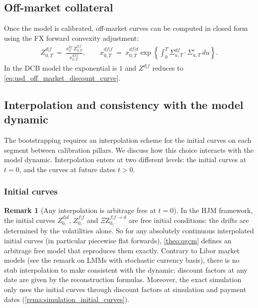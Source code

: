 \documentclass[11pt,english]{amsart}
\newcommand{\QZ}{{\Xi\mathrm{Z}}}
\theoremstyle{definition}
\newtheorem{rema}{Remark}
\begin{document}
\subsection{Off-market collateral}\label{ssec:cal_off_market}%

Once the model is calibrated, off-market curves can be computed in closed form using the FX forward convexity adjustment:
\begin{eqnarray*}
  Z^{d|f}_{0,T} ~=~ \frac{x^{df}_0\,Z^{f|f}_{0,T}}{x^{df|f}_{0,T}} , \qquad
  x^{df|f}_{0,T} ~=~ x^{df|d}_{0,T}\exp\left\{\int_0^T\Sigma^{df}_{u,T}\cdot\Sigma^c_{u,T}\,du\right\} .
\end{eqnarray*}
In the DCB model the exponential is $1$ and $Z^{d|f}$ reduces to \eqref{eq:usd_off_market_discount_curve}.


\newpage%
\subsection{Interpolation and consistency with the model dynamic}\label{ssec:interpolation_consistency}

The bootstrapping requires an interpolation scheme for the initial curves on each segment between calibration pillars. We discuss how this choice interacts with the model dynamic. Interpolation enters at two different levels: the initial curves at $t=0$, and the curves at future dates $t>0$.

\subsubsection{Initial curves}

\begin{rema}[Any interpolation is arbitrage free at $t=0$]
In the HJM framework, the initial curves $Z^{d|d}_{0,\cdot}$, $Z^{f|f}_{0,\cdot}$ and $\QZ^{f|f\to d}_{0,\cdot}$ are free initial conditions: the drifts are determined by the volatilities alone. So for any absolutely continuous interpolated initial curves (in particular piecewise flat forwards), \autoref{theo:qgcm} defines an arbitrage free model that reproduces them exactly. Contrary to Libor market models (see the remark on LMMs with stochastic currency basis), there is no stub interpolation to make consistent with the dynamic: discount factors at any date are given by the reconstruction formulas. Moreover, the exact simulation only uses the initial curves through discount factors at simulation and payment dates (\autoref{rema:simulation_initial_curves}).
\end{rema}
\end{document}
